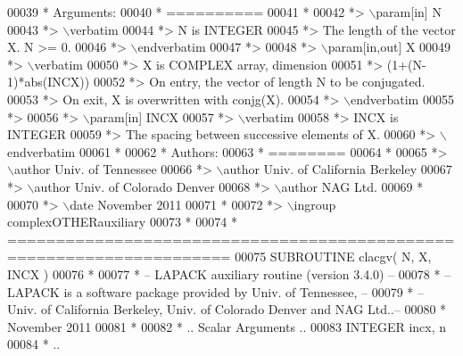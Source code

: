 \begin{DoxyCode}
00039 \textcolor{comment}{*  Arguments:}
00040 \textcolor{comment}{*  ==========}
00041 \textcolor{comment}{*}
00042 \textcolor{comment}{*> \(\backslash\)param[in] N}
00043 \textcolor{comment}{*> \(\backslash\)verbatim}
00044 \textcolor{comment}{*>          N is INTEGER}
00045 \textcolor{comment}{*>          The length of the vector X.  N >= 0.}
00046 \textcolor{comment}{*> \(\backslash\)endverbatim}
00047 \textcolor{comment}{*>}
00048 \textcolor{comment}{*> \(\backslash\)param[in,out] X}
00049 \textcolor{comment}{*> \(\backslash\)verbatim}
00050 \textcolor{comment}{*>          X is COMPLEX array, dimension}
00051 \textcolor{comment}{*>                         (1+(N-1)*abs(INCX))}
00052 \textcolor{comment}{*>          On entry, the vector of length N to be conjugated.}
00053 \textcolor{comment}{*>          On exit, X is overwritten with conjg(X).}
00054 \textcolor{comment}{*> \(\backslash\)endverbatim}
00055 \textcolor{comment}{*>}
00056 \textcolor{comment}{*> \(\backslash\)param[in] INCX}
00057 \textcolor{comment}{*> \(\backslash\)verbatim}
00058 \textcolor{comment}{*>          INCX is INTEGER}
00059 \textcolor{comment}{*>          The spacing between successive elements of X.}
00060 \textcolor{comment}{*> \(\backslash\)endverbatim}
00061 \textcolor{comment}{*}
00062 \textcolor{comment}{*  Authors:}
00063 \textcolor{comment}{*  ========}
00064 \textcolor{comment}{*}
00065 \textcolor{comment}{*> \(\backslash\)author Univ. of Tennessee }
00066 \textcolor{comment}{*> \(\backslash\)author Univ. of California Berkeley }
00067 \textcolor{comment}{*> \(\backslash\)author Univ. of Colorado Denver }
00068 \textcolor{comment}{*> \(\backslash\)author NAG Ltd. }
00069 \textcolor{comment}{*}
00070 \textcolor{comment}{*> \(\backslash\)date November 2011}
00071 \textcolor{comment}{*}
00072 \textcolor{comment}{*> \(\backslash\)ingroup complexOTHERauxiliary}
00073 \textcolor{comment}{*}
00074 \textcolor{comment}{*  =====================================================================}
00075 \textcolor{keyword}{      SUBROUTINE }clacgv( N, X, INCX )
00076 \textcolor{comment}{*}
00077 \textcolor{comment}{*  -- LAPACK auxiliary routine (version 3.4.0) --}
00078 \textcolor{comment}{*  -- LAPACK is a software package provided by Univ. of Tennessee,    --}
00079 \textcolor{comment}{*  -- Univ. of California Berkeley, Univ. of Colorado Denver and NAG Ltd..--}
00080 \textcolor{comment}{*     November 2011}
00081 \textcolor{comment}{*}
00082 \textcolor{comment}{*     .. Scalar Arguments ..}
00083       \textcolor{keywordtype}{INTEGER}            incx, n
00084 \textcolor{comment}{*     ..}

\end{DoxyCode}
